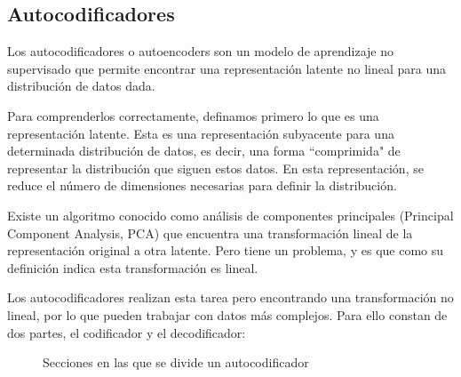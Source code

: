 \subsection{Autocodificadores}
Los autocodificadores o autoencoders son un modelo de aprendizaje no supervisado que permite encontrar una representación latente no lineal para una distribución de datos dada.

Para comprenderlos correctamente, definamos primero lo que es una representación latente. Esta es una representación subyacente para una determinada distribución de datos, es decir, una forma ``comprimida" de representar la distribución que siguen estos datos. En esta representación, se reduce el número de dimensiones necesarias para definir la distribución.

Existe un algoritmo conocido como análisis de componentes principales (Principal Component Analysis, PCA) que encuentra una transformación lineal de la representación original a otra latente. Pero tiene un problema, y es que como su definición indica esta transformación es lineal. \cite{vqvae}

Los autocodificadores realizan esta tarea pero encontrando una transformación no lineal, por lo que pueden trabajar con datos más complejos. Para ello constan de dos partes, el codificador y el decodificador:

\begin{figure}[H]
\centering
    \caption{Secciones en las que se divide un autocodificador \cite{vqvae}}
\end{figure}


